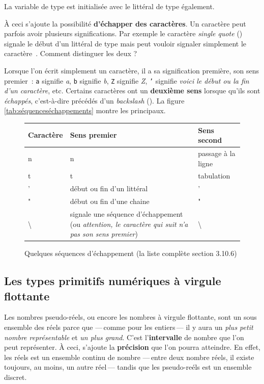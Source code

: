 La variable  de type  est initialisée avec le littéral
 de type  également. 


À ceci s'ajoute la possibilité \textbf{d'échapper des caractères}. Un caractère
peut parfois avoir plusieurs significations. Par exemple le caractère
\textit{single quote} () signale le début d'un littéral de type 
mais peut vouloir signaler simplement le caractère~.   
Comment distinguer les deux ?

Lorsque l'on écrit simplement un caractère, il a sa signification première, son 
sens premier~: 
\texttt{a} signifie \textit{a},
\texttt{b} signifie \textit{b},
\texttt{Z} signifie \textit{Z},
\texttt{'} signifie \textit{voici le début ou la fin d'un caractère}, etc. 
Certains caractères ont un \textbf{deuxième sens} lorsque qu'ils sont 
\textit{échappés}, c'est-à-dire précédés d'un \textit{backslash} 
(\pc{\textbackslash}). La figure \vref{tab:séquenceséchappements} montre les 
principaux.

\begin{figure}[h]
	\centering
	\begin{tabular}[h]{|l|p{6cm}|l|}
		\hline
		\rowcolor{black!20}
		\textbf{Caractère}	&	\textbf{Sens premier}	& \textbf{Sens second}	\\
		\hline
		n					&	n						& passage à la ligne	\\
		t					&	t						& tabulation		\\
		'					&	début ou fin d'un littéral \pc{char}	
														&	'	\\
		"					& 	début ou fin d'une chaine 	
														&	"	\\
		\textbackslash		& 	signale une séquence d'échappement 
								(ou \textit{attention, le caractère qui suit 
								n'a pas son sens premier}) 	
														&	\textbackslash	\\
		\hline
	\end{tabular}
	\caption{Quelques séquences d'échappement (la liste complète \cite{jls9} section 3.10.6)}
	\label{tab:séquenceséchappements}
\end{figure}



\subsection{Les types primitifs numériques à virgule flottante}

Les nombres pseudo-réels, ou encore les nombres à virgule flottante, sont un
sous ensemble des réels parce que —\,comme pour les entiers\,— il y aura un
\textit{plus petit nombre représentable} et \textit{un plus grand}. C'est
l'\textbf{intervalle} de nombre que l'on peut représenter. À ceci, s'ajoute la
\textbf{précision} que l'on pourra atteindre. En effet, les réels est un
ensemble continu de nombre —\,entre deux nombre réels, il existe toujours, au
moins, un autre réel\,— tandis que les pseudo-reéls est un ensemble discret. 

